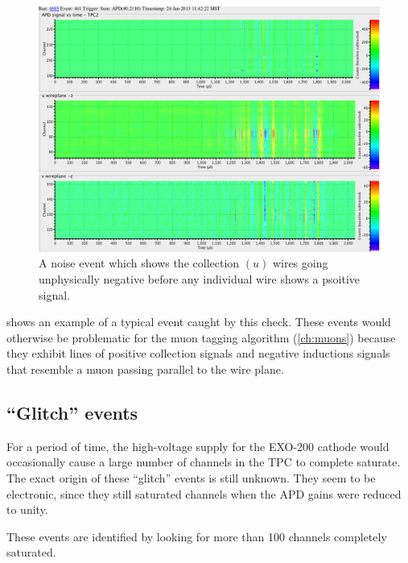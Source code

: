 \documentclass[herrin-thesis.tex]{subfiles}
\begin{document}
\begin{figure}[tbp]
\centering
\includegraphics[width=\columnwidth]{./plots/noise_eventdisplay_run_4685_ev_0441.png}
\caption{A noise event which shows the collection \((u)\) wires going unphysically negative before any individual wire shows a psoitive signal.}
\label{fig:noise_sum_u_neg}
\end{figure}

 shows an example of a typical event caught by this check. These events would otherwise be problematic for the muon tagging algorithm (\cref{ch:muons}) because they exhibit lines of positive collection signals and negative inductions signals that resemble a muon passing parallel to the wire plane.

\subsection{``Glitch'' events}
For a period of time, the high-voltage supply for the EXO-200 cathode would occasionally cause a large number of channels in the TPC to complete saturate. The exact origin of these ``glitch'' events is still unknown. They seem to be electronic, since they still saturated channels when the APD gains were reduced to unity.

These events are identified by looking for more than 100 channels completely saturated.
\end{document}
